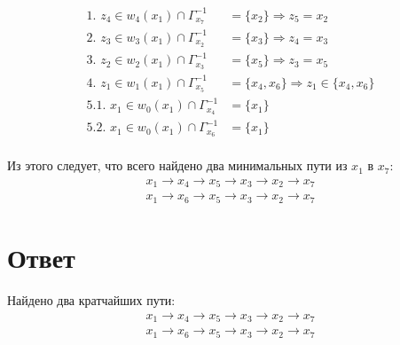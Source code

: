 \documentclass{article}
\begin{document}
\begin{align*}
    \text{1.   } z_4 \in w_4(x_1) \cap \Gamma^{-1}_{x_7} &= \{x_2\} \Rightarrow z_5 = x_2 \\
    \text{2.   } z_3 \in w_3(x_1) \cap \Gamma^{-1}_{x_2} &= \{x_3\} \Rightarrow z_4 = x_3 \\
    \text{3.   } z_2 \in w_2(x_1) \cap \Gamma^{-1}_{x_3} &= \{x_5\} \Rightarrow z_3 = x_5 \\
    \text{4.   } z_1 \in w_1(x_1) \cap \Gamma^{-1}_{x_5} &= \{x_4, x_6\} \Rightarrow
z_1 \in \{x_4, x_6\} \\
    \text{5.1. } x_1 \in w_0(x_1) \cap \Gamma^{-1}_{x_4} &= \{x_1\} \\
    \text{5.2. } x_1 \in w_0(x_1) \cap \Gamma^{-1}_{x_6} &= \{x_1\} \\
\end{align*}

Из этого следует, что всего найдено два минимальных пути из $x_1$ в $x_7$:
\begin{align*}
    x_1 \rightarrow x_4 \rightarrow x_5 \rightarrow x_3 \rightarrow x_2 \rightarrow x_7 \\
    x_1 \rightarrow x_6 \rightarrow x_5 \rightarrow x_3 \rightarrow x_2 \rightarrow x_7
\end{align*}


\section*{Ответ}
Найдено два кратчайших пути:
\begin{align*}
    x_1 \rightarrow x_4 \rightarrow x_5 \rightarrow x_3 \rightarrow x_2 \rightarrow x_7 \\
    x_1 \rightarrow x_6 \rightarrow x_5 \rightarrow x_3 \rightarrow x_2 \rightarrow x_7
\end{align*}
\end{document}
